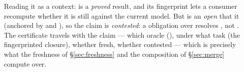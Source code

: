 Reading it as a context:  is a \emph{proved} result, and its fingerprint lets a consumer
recompute whether it is still  against the current model. But  is an
\emph{open}  that  it (anchored by  and ),
so the claim is \emph{contested}: a  obligation over  resolves
, not . The certificate travels with the claim --- which oracle
(), under what task (the fingerprinted closure), whether fresh, whether contested ---
which is precisely what the freshness of \S\ref{sec:freshness} and the composition of \S\ref{sec:merge}
compute over.
